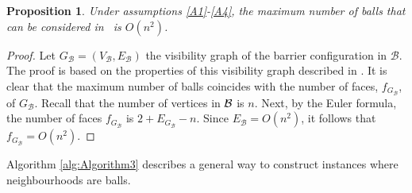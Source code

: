 \documentclass[a4paper,  review, authoryear, 1p.]{elsarticle}
\newcommand{\TSPHN}{{\sf{H-TSPHN}\xspace }}
\newcommand{\VB}{{V^{}_{\mathcal B}}}
\newcommand{\EB}{{E^{}_{\mathcal B}}}
\newtheorem{prop}{Proposition}
\newcommand{\JP}[1]{{\color{armygreen}#1}}
\newcommand{\CV}[1]{{\color{red}#1}}
\begin{document}


\begin{prop}
	Under assumptions \ref{A1}-\ref{A4}, the maximum number of balls that can be considered in \TSPHN \ is $O(n^2)$.
\end{prop}
\begin{proof}
	\CV{Let $G_{\mathcal B}=(\VB, \EB)$ the visibility graph of the barrier configuration in $\mathcal B$. The proof is based on the properties of this visibility graph described in \cite{mitchell2017a}.  It is clear that the maximum number of balls coincides with the number of faces, $f_{G_{\mathcal B}}$, of $G_{\mathcal B}$.  Recall that the number of vertices in $\cal B$ is $n$. Next, by the Euler formula, the number of faces $f_{G_{\mathcal B}}$ is $2+E_{G_{\mathcal B}}-n$. Since $\EB=O(n^2)$, it follows that $f_{G_{\mathcal B}}=O(n^2)$.}
\end{proof}

Algorithm \ref{alg:Algorithm3} describes a general way to construct instances where neighbourhoods are balls.
\end{document}

